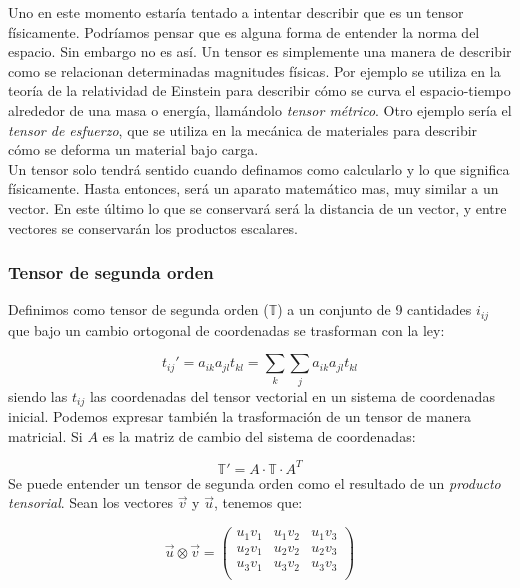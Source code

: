 \documentclass[12pt,a4paper]{book}
\begin{document}
Uno en este momento estaría tentado a intentar describir que es un tensor físicamente. Podríamos pensar que es alguna forma de entender la norma del espacio. Sin embargo no es así. Un tensor es simplemente una manera de describir como se relacionan determinadas magnitudes físicas. Por ejemplo se utiliza en la teoría de la relatividad de Einstein para describir cómo se curva el espacio-tiempo alrededor de una masa o energía, llamándolo \textit{tensor métrico}. Otro ejemplo sería el \textit{tensor de esfuerzo}, que se utiliza en la mecánica de materiales para describir cómo se deforma un material bajo carga. \\

Un tensor solo tendrá sentido cuando definamos como calcularlo y lo que significa físicamente. Hasta entonces, será un aparato matemático mas, muy similar a un vector. En este último lo que se conservará será la distancia de un vector, y entre vectores se conservarán los productos escalares.

\subsubsection{Tensor de segunda orden} 

Definimos como tensor de segunda orden ($\mathbb{T}$) a un conjunto de 9 cantidades $i_{ij}$ que bajo un cambio ortogonal de coordenadas se trasforman con la ley:

\begin{equation}
t_{ij}' = a_{ik} a_{jl} t_{kl} = \sum_k \sum_j  a_{ik} a_{jl} t_{kl}
\end{equation}
siendo las $t_{ij}$ las coordenadas del tensor vectorial en un sistema de coordenadas inicial. Podemos expresar también la trasformación de un tensor de manera matricial. Si $A$ es la matriz de cambio del sistema de coordenadas:

\begin{equation}
\mathbb{T}' = A \cdot \mathbb{T} \cdot A^T
\end{equation}
Se puede entender un tensor de segunda orden como el resultado de un \textit{producto tensorial}. Sean los vectores $\vec{v}$ y $\vec{u}$, tenemos que:

\begin{equation}
\vec{u} \otimes \vec{v} = \begin{pmatrix}
u_1 v_1 &
u_1 v_2 &
u_1 v_3 \\ 
u_2 v_1 &
u_2 v_2 &
u_2 v_3 \\ 
u_3 v_1 &
u_3 v_2 &
u_3 v_3 \\ 
\end{pmatrix}
\end{equation}
\end{document}
